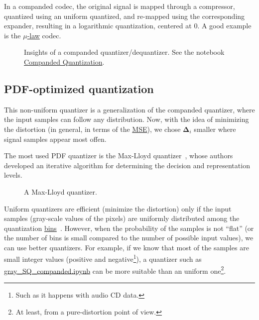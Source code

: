 In a companded codec, the original signal is mapped through a
compressor, quantized using an uniform quantized, and re-mapped using
the corresponding expander, resulting in a logarithmic quantization,
centered at $0$. A good example is the
\href{https://en.wikipedia.org/wiki/\%CE\%9C-law_algorithm}{\(\mu\)-law}
codec.

\begin{figure}
  \centering
  \caption{Insights of a companded quantizer/dequantizer. See the
    notebook
    \href{https://github.com/vicente-gonzalez-ruiz/scalar_quantization/blob/master/docs/graphics/companded_quantization.ipynb}{Companded
      Quantization}.}
  \label{fig:companded_quantizer}
\end{figure}


\subsection{PDF-optimized quantization}

This non-uniform quantizer is a generalization of the companded
quantizer, where the input samples can follow any distribution. Now,
with the idea of minimizing the distortion (in general, in terms of
the \href{https://en.wikipedia.org/wiki/Mean_squared_error}{MSE}), we
chose ${\mathbf\Delta}_i$ smaller where signal samples appear most
offen.

The most used PDF quantizer is the Max-Lloyd
quantizer~\cite{lloyd1982least}, whose authors developed an iterative
algorithm for determining the decision and representation levels.

\begin{figure}
  \centering
  \caption{A Max-Lloyd quantizer.}
  \label{fig:Max-Lloyd}
\end{figure}

Uniform quantizers are efficient (minimize the distortion) only if the
input samples (gray-scale values of the pixels) are uniformly
distributed among the quantization
\href{https://en.wikipedia.org/wiki/Data_binning}{bins}~\cite{vruiz__scalar_quantization}. However,
when the probability of the samples is not ``flat'' (or the number of
bins is small compared to the number of possible input values), we can
use better quantizers. For example, if we know that most of the
samples are small integer values (positive and negative\footnote{Such
as it happens with audio CD data.}), a quantizer such as
\href{https://github.com/vicente-gonzalez-ruiz/scalar_quantization/blob/master/docs/gray_SQ_companded.ipynb}{gray\_SQ\_companded.ipynb}
can be more suitable than an uniform one\footnote{At least, from a
  pure-distortion point of view.}.

